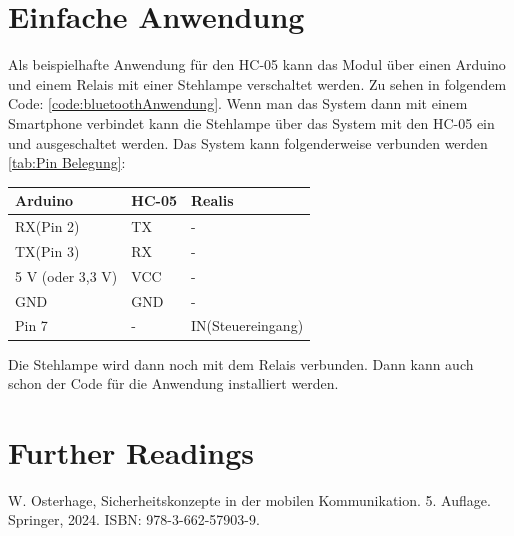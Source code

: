{
  \label{code:bluetoothEinfach}
}



\section{Einfache Anwendung}

Als beispielhafte Anwendung für den HC-05 kann das Modul über einen Arduino und einem Relais mit einer Stehlampe verschaltet  werden. Zu sehen in folgendem Code: \ref{code:bluetoothAnwendung}. Wenn man das System dann mit einem Smartphone verbindet kann die Stehlampe über das System mit den HC-05 ein und ausgeschaltet werden. Das System kann folgenderweise verbunden werden \ref{tab:Pin Belegung}: 

\begin{center}
    \begin{tabular}{|l|l|l|}
        \hline
        \textbf{Arduino} & \textbf{HC-05} & \textbf{Realis}\\ \hline
        RX(Pin 2) 		 & 		TX 		  &        -       \\ \hline
        TX(Pin 3)		 &		RX		  &		   -	   \\ \hline
        5 V (oder 3,3 V)   &		VCC		  &		   -	   \\ \hline
        GND				 &		GND		  &		   -       \\ \hline
        Pin 7			 &       -		  &IN(Steuereingang)\\ \hline
    \end{tabular}
    \label{tab:Pin Belegung}
\end{center}

Die Stehlampe wird dann noch mit dem Relais verbunden. Dann kann auch schon der Code für die Anwendung installiert werden.

{
    \label{code:bluetoothAnwendung}
}



\section{Further Readings}

W. Osterhage, Sicherheitskonzepte in der mobilen Kommunikation. 5. Auflage. Springer, 2024. ISBN:  978-3-662-57903-9.\cite{Osterhage:2018}

